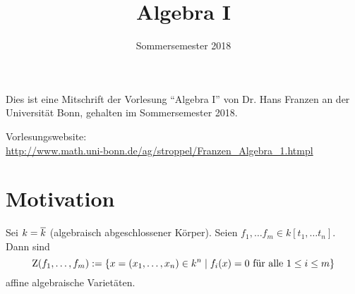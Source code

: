 \documentclass[12pt,a4paper]{scrartcl}
\author{}
\title{Algebra I}
\subtitle{Sommersemester 2018}
\date{\lastcompiled}
\theoremstyle{cplain}
\theoremstyle{cdef}
\begin{document}
\maketitle
\tableofcontents
\newpage

\noindent
Dies ist eine Mitschrift der Vorlesung \enquote{Algebra I} von Dr. Hans Franzen an der Universität Bonn, gehalten im Sommersemester 2018.

\bigskip

\noindent
Vorlesungswebsite:\\
\url{http://www.math.uni-bonn.de/ag/stroppel/Franzen_Algebra_1.htmpl}

\nocite{atiyah-macdonald}
\nocite{eisenbud}
\nocite{matsumura}
\nocite{ulrich-goertz}
\printbibliography[notkeyword=moduln-hir,title=Allgemeine Literatur]

\nocite{lang}
\nocite{hungerford}
\printbibliography[keyword=moduln-hir,title=Literatur zu \cref{sec:moduln ueber hir}]


\newpage


\section{Motivation}
Sei $k=\overline k$ (algebraisch abgeschlossener Körper). Seien $f_1, \dots f_m \in k[t_1,\dots t_n]$. Dann sind \[ \operatorname{Z}(f_1,\dots, f_m) := \{x=(x_1,\dots, x_n) \in k^n \mid f_i(x)=0 \text{ für alle $1\le i \le m$} \}\] affine algebraische Varietäten.
\end{document}
